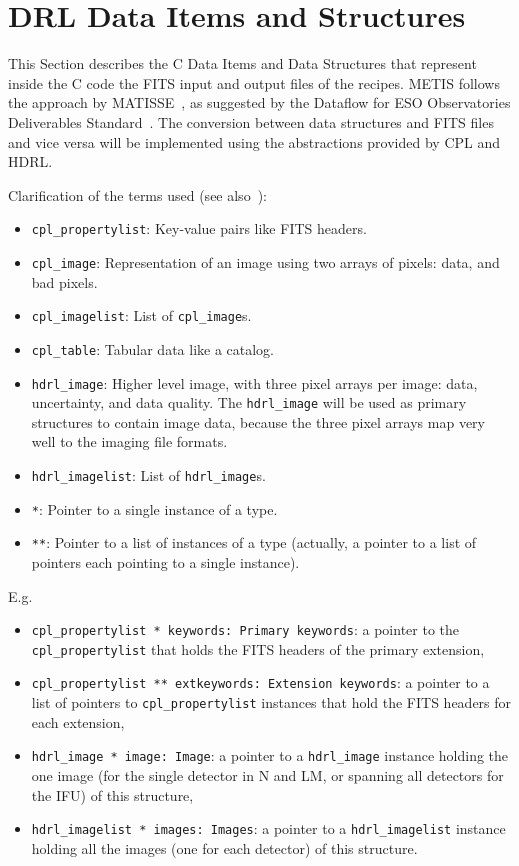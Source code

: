 \clearpage
\section{DRL Data Items and Structures}\label{sec:drl_data_structures}


This Section describes the C Data Items and Data Structures that represent inside the C code the FITS input and output files of the recipes. \ac{METIS} follows the approach by MATISSE~\cite{MATISSE-DRLD}, as suggested by the Dataflow for ESO Observatories Deliverables Standard~\cite{1618}.
The conversion between data structures and \ac{FITS} files and vice versa will be implemented using the abstractions provided by \ac{CPL} and \ac{HDRL}. 

Clarification of the terms used (see also~\cite{hdrl-manual}):
\begin{itemize}
    \item \texttt{cpl\_propertylist}: Key-value pairs like \ac{FITS} headers.
    \item \texttt{cpl\_image}: Representation of an image using two arrays of pixels: data, and bad pixels.
    \item \texttt{cpl\_imagelist}: List of \texttt{cpl\_image}s.
    \item \texttt{cpl\_table}: Tabular data like a catalog.
    \item \texttt{hdrl\_image}: Higher level image, with three pixel arrays per image: data, uncertainty, and data quality.
          The \texttt{hdrl\_image} will be used as primary structures to contain image data, because the three pixel arrays map very well to the imaging file formats.
    \item \texttt{hdrl\_imagelist}: List of \texttt{hdrl\_image}s.
    \item \texttt{*}: Pointer to a single instance of a type.
    \item \texttt{**}: Pointer to a list of instances of a type (actually, a pointer to a list of pointers each pointing to a single instance).
\end{itemize}

E.g.
\begin{itemize}
    \item \texttt{cpl\_propertylist * keywords: Primary keywords}: a pointer to the \texttt{cpl\_propertylist} that holds the \ac{FITS} headers of the primary extension,
    \item \texttt{cpl\_propertylist ** extkeywords: Extension keywords}: a pointer to a list of pointers to \texttt{cpl\_propertylist} instances that hold the \ac{FITS} headers for each extension,
    \item \texttt{hdrl\_image * image: Image}: a pointer to a \texttt{hdrl\_image} instance holding the one image (for the single detector in N and LM, or spanning all detectors for the IFU) of this structure,
    \item \texttt{hdrl\_imagelist * images: Images}: a pointer to a \texttt{hdrl\_imagelist} instance holding all the images (one for each detector) of this structure.
\end{itemize}

